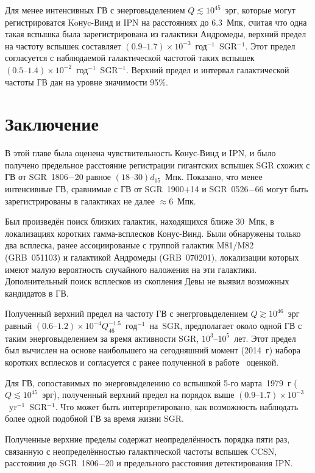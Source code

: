 Для менее интенсивных ГВ с энерговыделением $Q \lesssim 10^{45}$~эрг, которые 
могут регистрироватся Koнуc-Винд и IPN на расстояниях до 6.3~Мпк, считая что 
одна такая вспышка была зарегистрирована из галактики Андромеды, верхний предел 
на частоту вспышек составляет
${(0.9\textrm{--}1.7)\times 10^{-3}}$~год$^{-1}$~SGR$^{-1}$. Этот предел согласуется
с наблюдаемой галактической частотой таких вспышек 
${(0.5\textrm{--}1.4)\times 10^{-2}}$~год$^{-1}$~SGR$^{-1}$. Верхний предел и 
интервал галактической частоты ГВ дан на уровне значимости 95\%.

\section{Заключение}
В этой главе была оценена чувствительность Конус-Винд и IPN, и было получено 
предельное расстояние регистрации гигантских вспышек SGR схожих с ГВ от SGR~1806$-$20 
равное $(18\textrm{--}30) d_{15}$~Мпк. Показано, что менее интенсивные ГВ, сравнимые 
с ГВ от SGR~1900+14 и SGR~0526$-$66 могут быть зарегистрированы в галактиках 
не далее $\approx 6$~Мпк.

Был произведён поиск близких галактик, находящихся ближе 30~Мпк, в локализациях 
коротких гамма-всплесков Конус-Винд. Были обнаружены только два всплеска, ранее 
ассоциированые с группой галактик M81/M82 (GRB~051103) и галактикой Андромеды (GRB~070201),
локализации которых имеют малую вероятность случайного наложения на эти галактики.
Дополнительный поиск всплесков из скопления Девы не выявил возможных кандидатов в ГВ.

Полученный верхний предел на частоту ГВ с энегрговыделением $Q \gtrsim 10^{46}$~эрг равный
${(0.6\textrm{--}1.2)\times 10^{-4} Q_{46}^{-1.5}}$~год$^{-1}$~на~SGR, предполагает 
около одной ГВ с таким энерговыделением за время активности SGR, $10^3\textrm{--}10^5$~лет. 
Этот предел был вычислен на основе наибольшего на сегодняшний момент (2014~г) 
набора коротких всплесков и согласуется с ранее полученной в работе~\citep{Ofek2007} оценкой.
 
Для ГВ, сопоставимых по энерговыделению со вспышкой 5-го марта~1979~г ($Q \lesssim 10^{45}$~эрг), 
полученный верхний предел на порядок выше $(0.9\textrm{--}1.7)\times 10^{-3}$~yr$^{-1}$~SGR$^{-1}$. 
Что может быть интерпретировано, как возможность наблюдать более одной подобной ГВ за время жизни SGR.

Полученные верхние пределы содержат неопределённость порядка пяти раз, связанную с
неопределённостью галактической частоты вспышек CCSN, расстояния до SGR~1806$-$20 и
предельного расстояния детектирования IPN.

